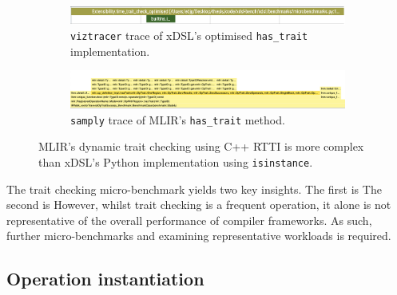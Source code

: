 \begin{figure}[H]
    \centering
    \begin{subfigure}[b]{\textwidth}
        \includegraphics[width=\textwidth]{images/14_understanding_compiler_performance/trait_checks/hastrait_xdsl_viztracer_optimised.png}
        \caption{\texttt{viztracer} trace of xDSL's optimised \texttt{has_trait} implementation.}
        \label{fig:ubenchmark-hastrait-xdsl-viztracer-optimised}
    \end{subfigure}
    \begin{subfigure}[b]{\textwidth}
        \includegraphics[width=\textwidth]{images/14_understanding_compiler_performance/trait_checks/hastrait_mlir_samply.png}
        \caption{\texttt{samply} trace of MLIR's \texttt{has_trait} method.}
        \label{fig:ubenchmark-hastrait-mlir-samply}
    \end{subfigure}
    \caption{MLIR's dynamic trait checking using C++ RTTI is more complex than xDSL's Python implementation using \texttt{isinstance}.}
    \label{fig:ubenchmark-hastrait-dynamism}
\end{figure}


The trait checking micro-benchmark yields two key insights.
The first is %
The second is %
However, whilst trait checking is a frequent operation, it alone is not representative of the overall performance of compiler frameworks. As such, further micro-benchmarks and examining representative workloads is required.


\subsection{Operation instantiation}
\label{ssec:op-instantiation}




